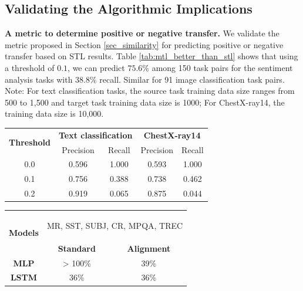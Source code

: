 \subsection{Validating the Algorithmic Implications}

\textbf{A metric to determine positive or negative transfer.}
We validate the metric proposed in Section \ref{sec_similarity} for predicting positive or negative transfer based on STL results.
Table \ref{tab:mtl_better_than_stl} shows that using a threshold of $0.1$, we can predict $75.6\%$ among 150 task pairs for the sentiment analysis tasks with $38.8\%$ recall.
Similar for 91 image classification task pairs.
Note: For text classification tasks, the source task training data size ranges from 500 to 1,500 and target task training data size is 1000; For ChestX-ray14, the training data size is 10,000.

\begin{table}
\begin{minipage}[t]{.58\textwidth}
	\centering
  \begin{tabular}{c c c c c}
	\toprule
		\multirow{2}{*}{{\bf Threshold}}  & \multicolumn{2}{c}{{\bf Text
		classification}} & \multicolumn{2}{c}{{\bf ChestX-ray14}} \\
		& Precision &  Recall & Precision &  Recall \\
		\cmidrule(lr){1-1} \cmidrule(lr){2-3} \cmidrule(lr){4-5}
		0.0 & 0.596 & 1.000 & 0.593 & 1.000 \\
		0.1 & 0.756 & 0.388 & 0.738 & 0.462 \\
		0.2 & 0.919 & 0.065 & 0.875 & 0.044 \\	
	\bottomrule
	\end{tabular}
	\vspace{0.1in}
	\label{tab:mtl_better_than_stl}
\end{minipage}
\quad
\begin{minipage}[t]{.40\textwidth}
	\centering
	\begin{tabular}{c c c}
		\toprule
		\multirow{2}{*}{{\bf Models}} & \multicolumn{2}{c}{\begin{minipage}{1.1in}\begin{center}
		MR, SST, SUBJ, CR, MPQA, TREC\end{center}\end{minipage}} \\
		\cmidrule(lr){2-3}
		& {\bf Standard} & {\bf Alignment} \\
		\midrule
		{\bf MLP}  & > 100\% & 39\% \\
		{\bf LSTM} & 36\% & 36\% \\
		\bottomrule
		\end{tabular}
	\vspace{0.1in}
	\label{tab:taskonomy}
\end{minipage}
\end{table}

